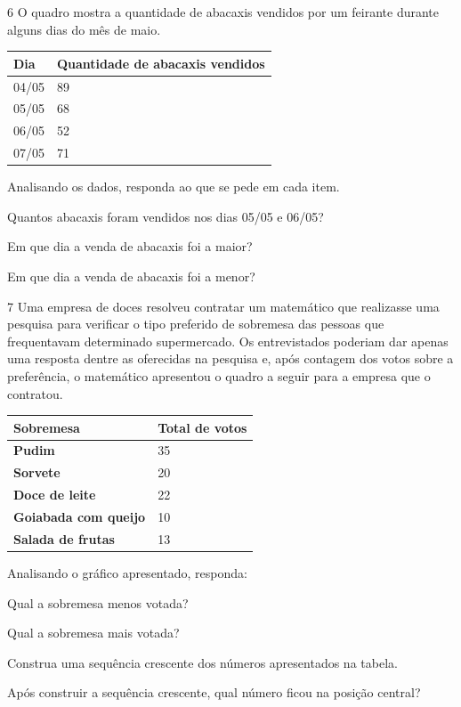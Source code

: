 \num{6} O quadro mostra a quantidade de abacaxis vendidos por um feirante
durante alguns dias do mês de maio.

\begin{longtable}[]{@{}ll@{}}
\toprule
\hline
\textbf{Dia} & \textbf{Quantidade de abacaxis vendidos}\tabularnewline
\hline
\midrule
\endhead
04/05 & 89\tabularnewline
\hline
05/05 & 68\tabularnewline
\hline
06/05 & 52\tabularnewline
\hline
07/05 & 71\tabularnewline
\bottomrule
\end{longtable}

Analisando os dados, responda ao que se pede em cada item.

\pagebreak

\begin{escolha}
\item Quantos abacaxis foram vendidos nos dias 05/05 e 06/05?

\item Em que dia a venda de abacaxis foi a maior?

\item Em que dia a venda de abacaxis foi a menor?
\end{escolha}

\num{7} Uma empresa de doces resolveu contratar um matemático que realizasse uma
pesquisa para verificar o tipo preferido de sobremesa das pessoas que
frequentavam determinado supermercado. Os entrevistados poderiam dar
apenas uma resposta dentre as oferecidas na pesquisa e, após contagem dos
votos sobre a preferência, o matemático apresentou o quadro a seguir
para a empresa que o contratou.

\begin{longtable}[]{@{}ll@{}}
\toprule
\hline
\textbf{Sobremesa} & \textbf{Total de votos}\tabularnewline
\hline
\midrule
\endhead
\textbf{Pudim} & 35\tabularnewline
\hline
\textbf{Sorvete} & 20\tabularnewline
\hline
\textbf{Doce de leite} & 22\tabularnewline
\hline
\textbf{Goiabada com queijo} & 10\tabularnewline
\hline
\textbf{Salada de frutas} & 13\tabularnewline
\hline
\bottomrule
\end{longtable}

Analisando o gráfico apresentado, responda:

\begin{escolha}
\item Qual a sobremesa menos votada?

\item Qual a sobremesa mais votada?

\item Construa uma sequência crescente dos números apresentados na tabela.

\item Após construir a sequência crescente, qual número ficou na posição central?
\end{escolha}

